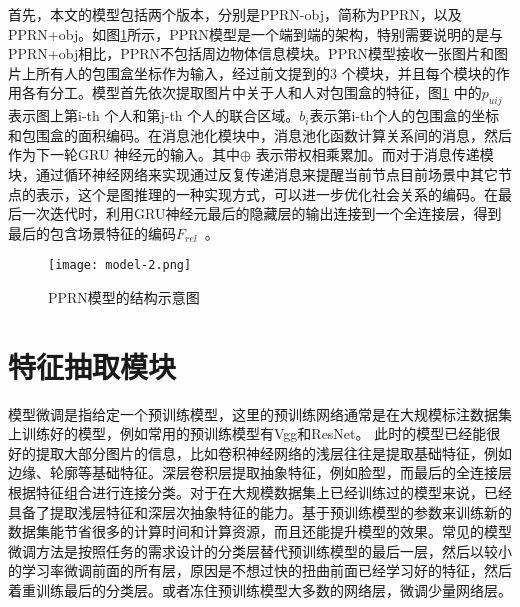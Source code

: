 首先，本文的模型包括两个版本，分别是PPRN-obj，简称为PPRN，以及PPRN+obj。如图\ref{fig:model-pprn}所示，PPRN模型是一个端到端的架构，特别需要说明的是与PPRN+obj相比，PPRN不包括周边物体信息模块。PPRN模型接收一张图片和图片上所有人的包围盒坐标作为输入，经过前文提到的3 个模块，并且每个模块的作用各有分工。模型首先依次提取图片中关于人和人对包围盒的特征，图\ref{fig:model-pprn} 中的$p_{uij}$表示图上第i-th 个人和第j-th 个人的联合区域。$b_{i}$表示第i-th个人的包围盒的坐标和包围盒的面积编码。在消息池化模块中，消息池化函数计算关系间的消息，然后作为下一轮GRU 神经元的输入。其中$\oplus$ 表示带权相乘累加。而对于消息传递模块，通过循环神经网络来实现通过反复传递消息来提醒当前节点目前场景中其它节点的表示，这个是图推理的一种实现方式，可以进一步优化社会关系的编码。在最后一次迭代时，利用GRU神经元最后的隐藏层的输出连接到一个全连接层，得到最后的包含场景特征的编码$F_{rel}$~。
\begin{figure}[htpb]
	\centering
	\texttt{[image: model-2.png]}
    \caption{PPRN模型的结构示意图}
	\vspace*{-3.5mm}
	\label{fig:model-pprn}
\end{figure}

\section{特征抽取模块}


模型微调是指给定一个预训练模型，这里的预训练网络通常是在大规模标注数据集上训练好的模型，例如常用的预训练模型有Vgg和ResNet。 此时的模型已经能很好的提取大部分图片的信息，比如卷积神经网络的浅层往往是提取基础特征，例如边缘、轮廓等基础特征。深层卷积层提取抽象特征，例如脸型，而最后的全连接层根据特征组合进行连接分类。对于在大规模数据集上已经训练过的模型来说，已经具备了提取浅层特征和深层次抽象特征的能力。基于预训练模型的参数来训练新的数据集能节省很多的计算时间和计算资源，而且还能提升模型的效果。常见的模型微调方法是按照任务的需求设计的分类层替代预训练模型的最后一层，然后以较小的学习率微调前面的所有层，原因是不想过快的扭曲前面已经学习好的特征，然后着重训练最后的分类层。或者冻住预训练模型大多数的网络层，微调少量网络层。


